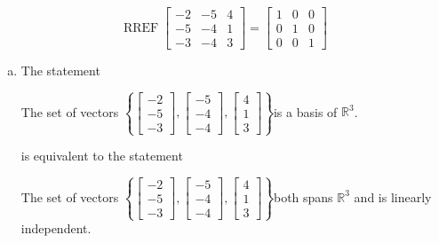\begin{exerciseAnswer} 


\[\operatorname{RREF} \left[\begin{array}{ccc}
-2 & -5 & 4 \\
-5 & -4 & 1 \\
-3 & -4 & 3
\end{array}\right] = \left[\begin{array}{ccc}
1 & 0 & 0 \\
0 & 1 & 0 \\
0 & 0 & 1
\end{array}\right] \]


\begin{enumerate}[(a)]
\item The statement 
\begin{center}\begin{minipage}{0.8\textwidth}
 The set of vectors \( \left\{ \left[\begin{array}{c}
-2 \\
-5 \\
-3
\end{array}\right] , \left[\begin{array}{c}
-5 \\
-4 \\
-4
\end{array}\right] , \left[\begin{array}{c}
4 \\
1 \\
3
\end{array}\right] \right\} \)is a basis of \(\mathbb{R}^3\). 
\end{minipage}\end{center}
     is equivalent to the statement 
\begin{center}\begin{minipage}{0.8\textwidth}
 The set of vectors \( \left\{ \left[\begin{array}{c}
-2 \\
-5 \\
-3
\end{array}\right] , \left[\begin{array}{c}
-5 \\
-4 \\
-4
\end{array}\right] , \left[\begin{array}{c}
4 \\
1 \\
3
\end{array}\right] \right\} \)both spans \(\mathbb{R}^3\) and is linearly independent.
\end{minipage}\end{center}
    

\end{enumerate}
\end{exerciseAnswer}
